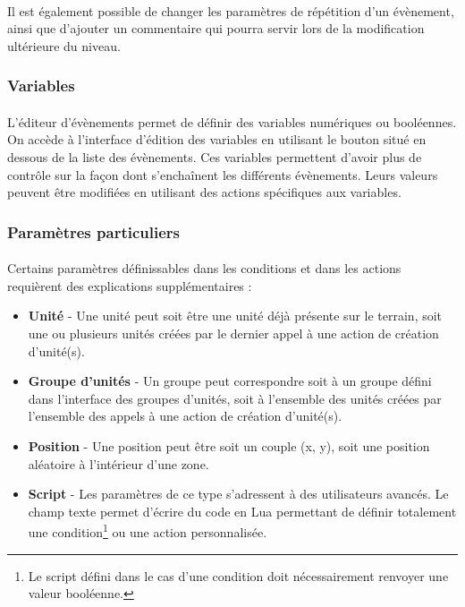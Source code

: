 \documentclass[a4paper]{article}
\begin{document}
\paragraph{ }
Il est également possible de changer les paramètres de répétition d'un évènement, ainsi que d'ajouter un commentaire qui pourra servir lors de la modification ultérieure du niveau.
\subsubsection{Variables}
\paragraph{ }
L'éditeur d'évènements permet de définir des variables numériques ou booléennes. On accède à l'interface d'édition des variables en utilisant le bouton situé en dessous de la liste des évènements. Ces variables permettent d'avoir plus de contrôle sur la façon dont s'enchaînent les différents évènements. Leurs valeurs peuvent être modifiées en utilisant des actions spécifiques aux variables.
\subsubsection{Paramètres particuliers}
\paragraph{ }
Certains paramètres définissables dans les conditions et dans les actions requièrent des explications supplémentaires :
\begin{itemize}
\item \textbf{Unité} - Une unité peut soit être une unité déjà présente sur le terrain, soit une ou plusieurs unités créées par le dernier appel à une action de création d'unité(s).
\item \textbf{Groupe d'unités} - Un groupe peut correspondre soit à un groupe défini dans l'interface des groupes d'unités, soit à l'ensemble des unités créées par l'ensemble des appels à une action de création d'unité(s).
\item \textbf{Position} - Une position peut être soit un couple (x, y), soit une position aléatoire à l'intérieur d'une zone.
\item \textbf{Script} - Les paramètres de ce type s'adressent à des utilisateurs avancés. Le champ texte permet d'écrire du code en Lua permettant de définir totalement une condition\footnote{Le script défini dans le cas d'une condition doit nécessairement renvoyer une valeur booléenne.} ou une action personnalisée.
\end{itemize}
\end{document}
